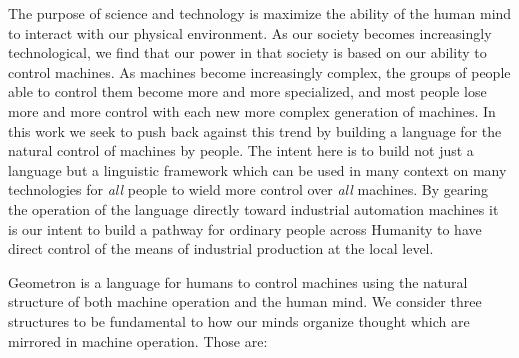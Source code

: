 The purpose of science and technology is maximize the ability of the
human mind to interact with our physical environment. As our society
becomes increasingly technological, we find that our power in that
society is based on our ability to control machines. As machines become
increasingly complex, the groups of people able to control them become
more and more specialized, and most people lose more and more control
with each new more complex generation of machines. In this work we seek
to push back against this trend by building a language for the natural
control of machines by people. The intent here is to build not just a
language but a linguistic framework which can be used in many context on
many technologies for \emph{all} people to wield more control over
\emph{all} machines. By gearing the operation of the language directly
toward industrial automation machines it is our intent to build a
pathway for ordinary people across Humanity to have direct control of
the means of industrial production at the local level.

Geometron is a language for humans to control machines using the natural
structure of both machine operation and the human mind. We consider
three structures to be fundamental to how our minds organize thought
which are mirrored in machine operation. Those are:

